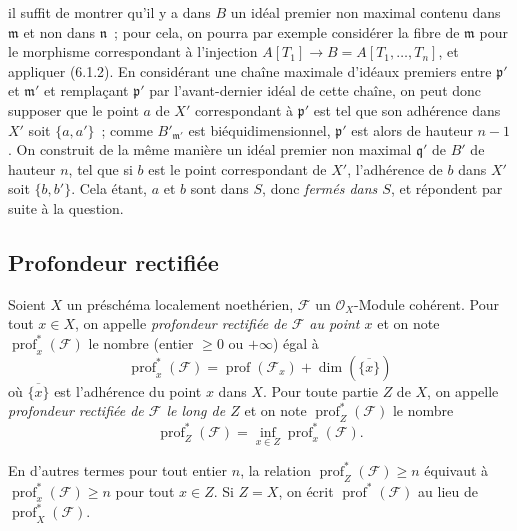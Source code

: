\begin{env}[10.7.3]
il suffit de montrer qu'il y a dans $B$ un idéal premier non maximal contenu dans
$\mathfrak m$ et non dans $\mathfrak n$~; pour cela, on pourra par exemple
considérer la fibre de $\mathfrak m$ pour le morphisme correspondant à l'injection
$A[T_1]\to B=A[T_1,\ldots,T_n]$, et appliquer (6.1.2). En considérant une chaîne
maximale d'idéaux premiers entre $\mathfrak p'$ et $\mathfrak m'$ et remplaçant
$\mathfrak p'$ par l'avant-dernier idéal de cette chaîne, on peut donc supposer
que le point $a$ de $X'$ correspondant à $\mathfrak p'$ est tel que son adhérence
dans $X'$ soit $\{a,a'\}$~; comme $B'_{\mathfrak m'}$ est biéquidimensionnel,
$\mathfrak p'$ est alors de hauteur $n-1$. On construit de la même manière un
idéal premier non maximal $\mathfrak q'$ de $B'$ de hauteur $n$, tel que si $b$
est le point correspondant de $X'$, l'adhérence de $b$ dans $X'$ soit
$\{b,b'\}$. Cela étant, $a$ et $b$ sont dans $S$, donc \emph{fermés dans $S$},
et répondent par suite à la question.
\end{env}

\subsection{Profondeur rectifiée}
\label{subsection:IV.10.8-fr}

\begin{definition}[10.8.1]
\label{IV.10.8.1-fr}
Soient $X$ un préschéma localement noethérien, $\mathcal F$ un $\mathcal O_X$-Module
cohérent. Pour tout $x\in X$, on appelle \emph{profondeur rectifiée de $\mathcal F$
au point $x$} et on note $\operatorname{prof}^{*}_{x}(\mathcal F)$ le nombre (entier
$\geq0$ ou $+\infty$) égal à
\begin{equation}
\label{IV.10.8.1.1-fr}
\tag{10.8.1.1}
\operatorname{prof}^{*}_{x}(\mathcal F)
=\operatorname{prof}(\mathcal F_x)+\dim(\overline{\{x\}})
\end{equation}
où $\overline{\{x\}}$ est l'adhérence du point $x$ dans $X$. Pour toute partie
$Z$ de $X$, on appelle \emph{profondeur rectifiée de $\mathcal F$ le long de $Z$}
et on note $\operatorname{prof}^{*}_{Z}(\mathcal F)$ le nombre
\begin{equation}
\label{IV.10.8.1.2-fr}
\tag{10.8.1.2}
\operatorname{prof}^{*}_{Z}(\mathcal F)
=\inf_{x\in Z}\operatorname{prof}^{*}_{x}(\mathcal F).
\end{equation}
\end{definition}

En d'autres termes pour tout entier $n$, la relation
$\operatorname{prof}^{*}_{Z}(\mathcal F)\geq n$ équivaut à
$\operatorname{prof}^{*}_{x}(\mathcal F)\geq n$ pour tout $x\in Z$. Si $Z=X$, on
écrit $\operatorname{prof}^{*}(\mathcal F)$ au lieu de
$\operatorname{prof}^{*}_{X}(\mathcal F)$.

